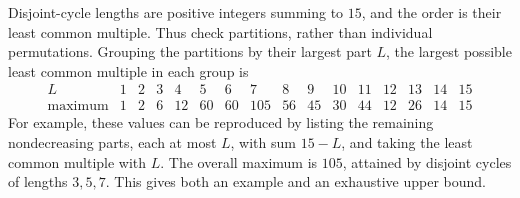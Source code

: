 \idea Disjoint-cycle lengths are positive integers summing to $15$, and the order is their least common multiple. Thus check partitions, rather than individual permutations.
Grouping the partitions by their largest part $L$, the largest possible least common multiple in each group is\[\begin{array}{c|rrrrrrrrrrrrrrr}L&1&2&3&4&5&6&7&8&9&10&11&12&13&14&15\\\hline \text{maximum}&1&2&6&12&60&60&105&56&45&30&44&12&26&14&15\end{array}\]For example, these values can be reproduced by listing the remaining nondecreasing parts, each at most $L$, with sum $15-L$, and taking the least common multiple with $L$. The overall maximum is $105$, attained by disjoint cycles of lengths $3,5,7$. This gives both an example and an exhaustive upper bound.

